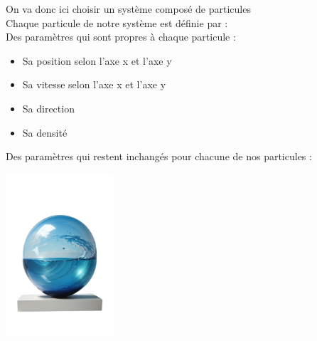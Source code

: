 \documentclass{article}
\begin{document}
\newpage
\vspace*{2pt}
\thispagestyle{landscape}
\parbox{0.7\textwidth}{
On va donc ici choisir un système composé de particules
\\Chaque particule  de notre système est définie par : 
\\Des paramètres qui sont propres à chaque particule :
\begin{itemize}
    \item Sa position selon l’axe x et l’axe y
    \item Sa vitesse selon l’axe x et l’axe y
    \item Sa direction 
    \item Sa densité
\end{itemize}


Des paramètres qui restent inchangés pour chacune de nos particules : 
}
\parbox{0.3\textwidth}{
    \includegraphics[width=0.3\textwidth]{particule}
}
\vspace*{\fill}
\end{document}
